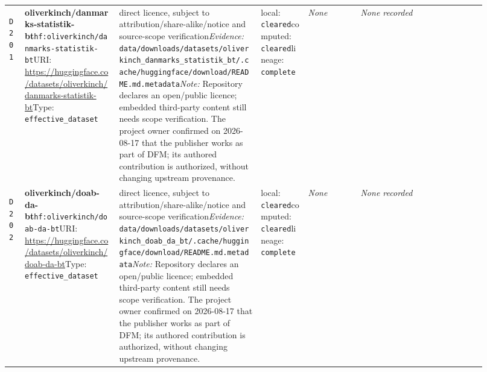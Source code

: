 \documentclass[9pt,a4paper]{article}
\newcommand{\depid}[1]{\hypertarget{dep:#1}{\texttt{#1}}}
\begin{document}
\begin{landscape}
\begin{longtable}{@{}L{0.035\linewidth}L{0.185\linewidth}L{0.27\linewidth}L{0.09\linewidth}L{0.10\linewidth}L{0.24\linewidth}@{}}
\depid{D201} & \textbf{oliverkinch/danmarks-statistik-bt}\newline \nolinkurl{hf:oliverkinch/danmarks-statistik-bt}\newline URI: \url{https://huggingface.co/datasets/oliverkinch/danmarks-statistik-bt}\newline Type: \texttt{effective\_dataset} & direct licence, subject to attribution/share-alike/notice and source-scope verification\newline \textit{Evidence:} \nolinkurl{data/downloads/datasets/oliverkinch_danmarks_statistik_bt/.cache/huggingface/download/README.md.metadata}\newline \textit{Note:} Repository declares an open/public licence; embedded third-party content still needs scope verification. The project owner confirmed on 2026-08-17 that the publisher works as part of DFM; its authored contribution is authorized, without changing upstream provenance. & local: \texttt{cleared}\newline computed: \texttt{cleared}\newline lineage: \texttt{complete} & \textit{None} & \textit{None recorded} \\
\depid{D202} & \textbf{oliverkinch/doab-da-bt}\newline \nolinkurl{hf:oliverkinch/doab-da-bt}\newline URI: \url{https://huggingface.co/datasets/oliverkinch/doab-da-bt}\newline Type: \texttt{effective\_dataset} & direct licence, subject to attribution/share-alike/notice and source-scope verification\newline \textit{Evidence:} \nolinkurl{data/downloads/datasets/oliverkinch_doab_da_bt/.cache/huggingface/download/README.md.metadata}\newline \textit{Note:} Repository declares an open/public licence; embedded third-party content still needs scope verification. The project owner confirmed on 2026-08-17 that the publisher works as part of DFM; its authored contribution is authorized, without changing upstream provenance. & local: \texttt{cleared}\newline computed: \texttt{cleared}\newline lineage: \texttt{complete} & \textit{None} & \textit{None recorded} \\

\end{longtable}
\end{landscape}
\end{document}
